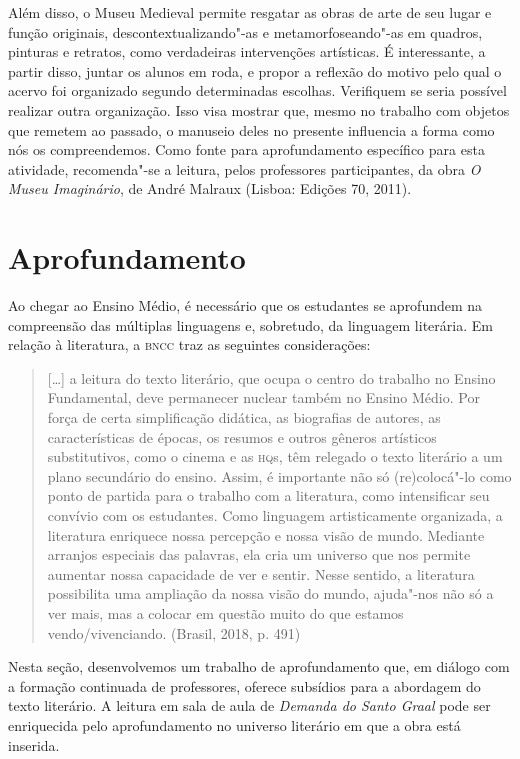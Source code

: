 \documentclass{extarticle}
\begin{document}
Além disso, o Museu Medieval permite resgatar as obras de arte de seu
lugar e função originais, descontextualizando"-as e metamorfoseando"-as em
quadros, pinturas e retratos, como verdadeiras intervenções artísticas.
É interessante, a partir disso, juntar os alunos em roda, e propor a
reflexão do motivo pelo qual o acervo foi organizado segundo
determinadas escolhas. Verifiquem se seria possível realizar outra
organização. Isso visa mostrar que, mesmo no trabalho com objetos que
remetem ao passado, o manuseio deles no presente influencia a forma como
nós os compreendemos. Como fonte para aprofundamento específico para
esta atividade, recomenda"-se a leitura, pelos professores participantes,
da obra \emph{O Museu Imaginário}, de André Malraux (Lisboa: Edições 70,
2011).

\section{Aprofundamento}

Ao chegar ao Ensino Médio, é necessário que os estudantes se aprofundem
na compreensão das múltiplas linguagens e, sobretudo, da linguagem
literária. Em relação à literatura, a \textsc{bncc} traz as seguintes
considerações:

\begin{quote}
{[}\ldots{}{]} a leitura do texto literário, que ocupa o centro do trabalho
no Ensino Fundamental, deve permanecer nuclear também no Ensino Médio.
Por força de certa simplificação didática, as biografias de autores, as
características de épocas, os resumos e outros gêneros artísticos
substitutivos, como o cinema e as \textsc{hq}s, têm relegado o texto literário a
um plano secundário do ensino. Assim, é importante não só (re)colocá"-lo
como ponto de partida para o trabalho com a literatura, como
intensificar seu convívio com os estudantes. Como linguagem
artisticamente organizada, a literatura enriquece nossa percepção e
nossa visão de mundo. Mediante arranjos especiais das palavras, ela cria
um universo que nos permite aumentar nossa capacidade de ver e sentir.
Nesse sentido, a literatura possibilita uma ampliação da nossa visão do
mundo, ajuda"-nos não só a ver mais, mas a colocar em questão muito do
que estamos vendo/vivenciando. (Brasil, 2018, p. 491)
\end{quote}

Nesta seção, desenvolvemos um trabalho de aprofundamento que, em diálogo
com a formação continuada de professores, oferece subsídios para a
abordagem do texto literário. A leitura em sala de aula de \emph{Demanda
do Santo Graal} pode ser enriquecida pelo aprofundamento no universo
literário em que a obra está inserida.
\end{document}
